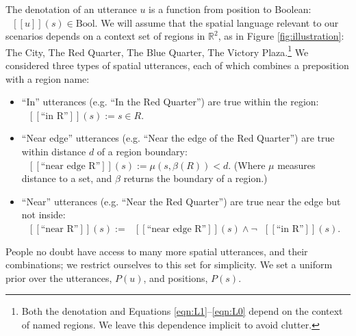 \documentclass[10pt,letterpaper]{article}
\newcommand{\denote}[1]{\mbox{ $[\![ #1 ]\!]$}}
\begin{document}
The denotation of an utterance $u$ is a function from position to Boolean: $\denote{u}(s)\in \text{Bool}$.
We will assume that the spatial language relevant to our scenarios depends on a context set of regions in $\mathbb{R}^2$, as in Figure \ref{fig:illustration}: The City, The Red Quarter, The Blue Quarter, The Victory Plaza.\footnote{Both the denotation and Equations \ref{eqn:L1}--\ref{eqn:L0} depend on the context of named regions. We leave this dependence implicit to avoid clutter.}
We considered three types of spatial utterances, each of which combines a preposition with a region name: 
\begin{itemize}
\item ``In'' utterances (e.g. ``In the Red Quarter'') are true within the region: $\denote{\text{``in R''}}(s) := s\in R$.
\item ``Near edge'' utterances (e.g. ``Near the edge of the Red Quarter'') are true within distance $d$ of a region boundary: $\denote{\text{``near edge R''}}(s) := \mu(s,\beta(R))<d$. (Where $\mu$ measures distance to a set, and $\beta$ returns the boundary of a region.)
\item ``Near'' utterances (e.g. ``Near the Red Quarter'') are true near the edge but not inside: $\denote{\text{``near R''}}(s) := 
\denote{\text{``near edge R''}}(s) \wedge \neg \denote{\text{``in R''}}(s)$.
\end{itemize}
People no doubt have access to many more spatial utterances, and their combinations; we restrict ourselves to this set for simplicity. We set a uniform prior over the utterances, $P(u)$, and positions, $P(s)$. 





\end{document}
